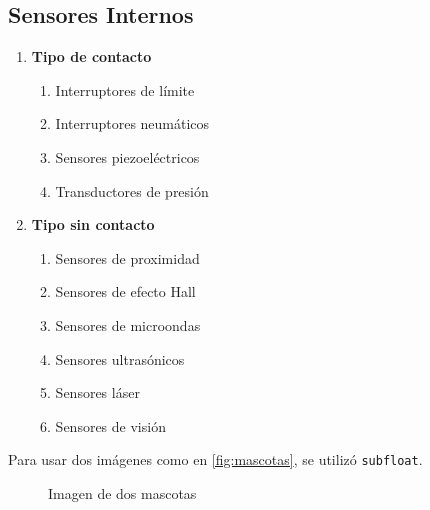 	\subsection{Sensores Internos}
	 \begin{enumerate}
		\item \textbf{Tipo de contacto}
		\begin{enumerate}
			\item Interruptores de límite
			\item Interruptores neumáticos
			\item Sensores piezoeléctricos
			\item Transductores de presión
		\end{enumerate}
		\item \textbf{Tipo sin contacto}
		\begin{enumerate}
			\item Sensores de proximidad
			\item Sensores de efecto Hall
			\item Sensores de microondas
			\item Sensores ultrasónicos
			\item Sensores láser
			\item Sensores de visión
		\end{enumerate}
	\end{enumerate}

Para usar dos imágenes como en \autoref{fig:mascotas}, se utilizó \texttt{subfloat}.
\begin{figure}[h]
	\centering
	\hfill
	\caption{Imagen de dos mascotas}
	\label{fig:mascotas}
\end{figure}